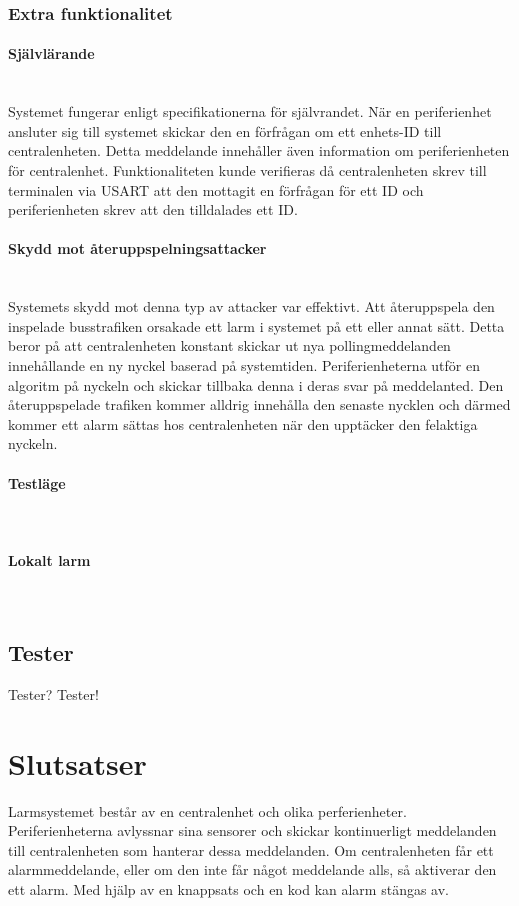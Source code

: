 \documentclass[a4paper]{article}
\newcommand{\subsubsubsection}[1]{\paragraph{#1}\mbox{}\\}
\begin{document}
\subsubsection{Extra funktionalitet}
\subsubsubsection{Självlärande}
Systemet fungerar enligt specifikationerna för självrandet. 
När en periferienhet ansluter sig till systemet skickar den en förfrågan om ett enhets-ID till centralenheten.
Detta meddelande innehåller även information om periferienheten för centralenhet.
Funktionaliteten kunde verifieras då centralenheten skrev till terminalen via USART att den mottagit en förfrågan för ett ID och periferienheten skrev att den tilldalades ett ID.
\subsubsubsection{Skydd mot återuppspelningsattacker}
Systemets skydd mot denna typ av attacker var effektivt. 
Att återuppspela den inspelade busstrafiken orsakade ett larm i systemet på ett eller annat sätt. 
Detta beror på att centralenheten konstant skickar ut nya pollingmeddelanden innehållande en ny nyckel baserad på systemtiden. 
Periferienheterna utför en algoritm på nyckeln och skickar tillbaka denna i deras svar på meddelanted.
Den återuppspelade trafiken kommer alldrig innehålla den senaste nycklen och därmed kommer ett alarm sättas hos centralenheten när den upptäcker den felaktiga nyckeln. 

\subsubsubsection{Testläge}
\subsubsubsection{Lokalt larm}

\subsection{Tester}
Tester? Tester!


\section{Slutsatser}

Larmsystemet består av en centralenhet och olika perferienheter. 
Periferienheterna avlyssnar sina sensorer och skickar kontinuerligt meddelanden till centralenheten som hanterar dessa meddelanden. 
Om centralenheten får ett alarmmeddelande, eller om den inte får något meddelande alls, så aktiverar den ett alarm. 
Med hjälp av en knappsats och en kod kan alarm stängas av.
\end{document}
